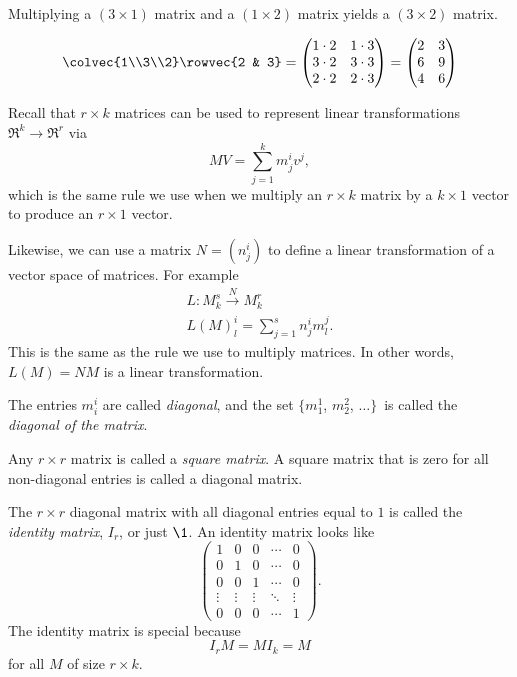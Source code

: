 \begin{example}
Multiplying a $(3\times 1)$ matrix and a $(1\times 2)$ matrix yields a $(3\times 2)$ matrix.

\[
\colvec{1\\3\\2} \rowvec{2 & 3} = 
\begin{pmatrix}
1\cdot 2 & 1\cdot 3 \\
3\cdot 2 & 3\cdot 3 \\
2\cdot 2 & 2\cdot 3 \\
\end{pmatrix}
= \begin{pmatrix}
2 & 3 \\
6 & 9 \\
4 & 6 \\
\end{pmatrix}
\]
\end{example}


Recall that $r\times k$ matrices can be used to represent linear transformations 
$ \Re^k \rightarrow \Re^r $
via \[MV = \sum_{j=1}^{k} m_j^iv^j , \] which is the same rule we use when we multiply an $r\times k$ matrix by a $k\times 1$ vector to produce an $r\times1$ vector.

Likewise, we can use a matrix $N=(n^i_j)$ to define a linear transformation of a vector space of matrices. For example
\begin{gather*}
L \colon M^s_k \stackrel{N}{\longrightarrow} M^r_k
\\
L(M)^i_l = \sum_{j=1}^{s} n_j^im^j_l.
\end{gather*}
This is the same as the rule we use to multiply matrices. \hypertarget{leftmult}{In other words,} \(L(M)=NM\) is a linear transformation.

\begin{definition}
The entries $m_i^i$ are called \emph{diagonal}, and the set $\{m_1^1$, $m_2^2$, $\ldots \}$~is called the \emph{diagonal of the matrix}.

Any $r\times r$ matrix is called a \emph{square matrix}.  A square matrix that is zero for all non-diagonal entries is called a diagonal matrix.

The $r\times r$ diagonal matrix with all diagonal entries equal to $1$ is called the \emph{identity matrix}, $I_r$, or just $\1$.  An identity matrix looks like \[
\begin{pmatrix}
1 & 0 & 0 & \cdots & 0 \\
0 & 1 & 0 & \cdots & 0 \\
0 & 0 & 1 & \cdots & 0 \\
\vdots & \vdots & \vdots & \ddots & \vdots \\
0 & 0 & 0 & \cdots & 1
\end{pmatrix}.
\]
The identity matrix is special because \[I_rM=MI_k=M\] for all $M$ of size $r\times k$.
\end{definition}

